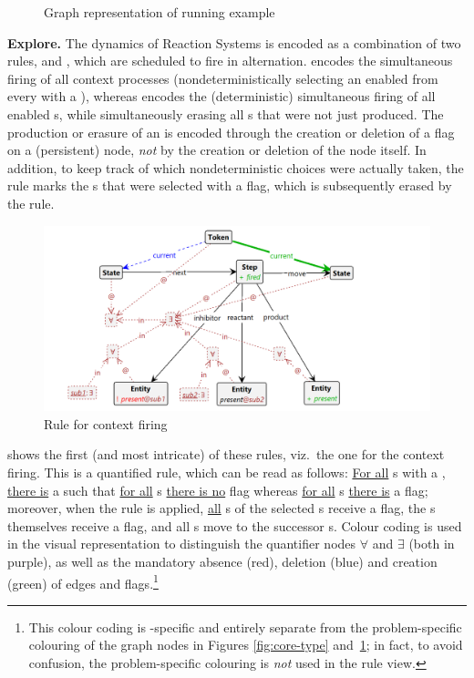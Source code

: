 \begin{figure}
\caption{Graph representation of running example}
\label{fig:toy}
\end{figure}

\medskip\noindent\textbf{Explore.}
%
The dynamics of Reaction Systems is encoded as a combination of two rules, \contextR and \reactR, which are scheduled to fire in alternation. \contextR encodes the simultaneous firing of all context processes (nondeterministically selecting an enabled \Step from every \State with a \Token), whereas \reactR encodes the (deterministic) simultaneous firing of all enabled \Reaction{}s, while simultaneously erasing all \Entity{}s that were not just produced. The production or erasure of an \Entity is encoded through the creation or deletion of a \present flag on a (persistent) \Entity node, \emph{not} by the creation or deletion of the node itself. In addition, to keep track of which nondeterministic choices were actually taken, the \contextR rule marks the \Step{}s that were selected with a \fired flag, which is subsequently erased by the \reactR rule. %

\begin{figure}
\centering
\includegraphics[scale=.2]{figs/context}
\caption{Rule for context firing}
\label{fig:context}
\end{figure}
%
 shows the first (and most intricate) of these rules, viz.\ the one for the context firing. This is a quantified rule, which can be read as follows: \uline{For all} \State{}s with a \Token, \uline{there is} a \nextt{} \Step such that \uline{for all} \inhibitor{}s \uline{there is no} \present flag whereas \uline{for all} \reactant{}s \uline{there is} a \present flag; moreover, when the rule is applied, \uline{all} \product{}s of the selected \Step{}s receive a \present flag, the \Step{}s themselves receive a \fired flag, and all \Token{}s move to the successor \State{}s. Colour coding is used in the visual representation to distinguish the quantifier nodes $\forall$ and $\exists$ (both in purple), as well as the mandatory absence (red), deletion (blue) and creation (green) of edges and flags.\footnote{This colour coding is \GROOVE-specific and entirely separate from the problem-specific colouring of the graph nodes in Figures \ref{fig:core-type} and~\ref{fig:toy}; in fact, to avoid confusion, the problem-specific colouring is \emph{not} used in the rule view.}

